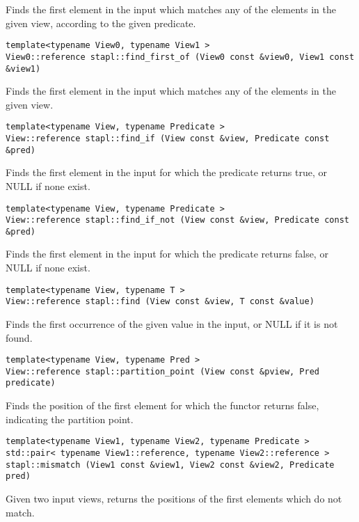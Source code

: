 Finds the first element in the input which matches any of the elements in the given view, according to the given predicate.

\begin{verbatim}
template<typename View0, typename View1 >
View0::reference stapl::find_first_of (View0 const &view0, View1 const &view1)
\end{verbatim}

Finds the first element in the input which matches any of the elements in the given view.

\begin{verbatim}
template<typename View, typename Predicate >
View::reference stapl::find_if (View const &view, Predicate const &pred)
\end{verbatim}

Finds the first element in the input for which the predicate returns true, or NULL if none exist.

\begin{verbatim}
template<typename View, typename Predicate >
View::reference stapl::find_if_not (View const &view, Predicate const &pred)
\end{verbatim}

Finds the first element in the input for which the predicate returns false, or NULL if none exist.

\begin{verbatim}
template<typename View, typename T >
View::reference stapl::find (View const &view, T const &value)
\end{verbatim}

Finds the first occurrence of the given value in the input, or NULL if it is not found.

\begin{verbatim}
template<typename View, typename Pred >
View::reference stapl::partition_point (View const &pview, Pred predicate)
\end{verbatim}

Finds the position of the first element for which the functor returns false, indicating the partition point.

\begin{verbatim}
template<typename View1, typename View2, typename Predicate >
std::pair< typename View1::reference, typename View2::reference >
stapl::mismatch (View1 const &view1, View2 const &view2, Predicate pred)
\end{verbatim}

Given two input views, returns the positions of the first elements which do not match.


